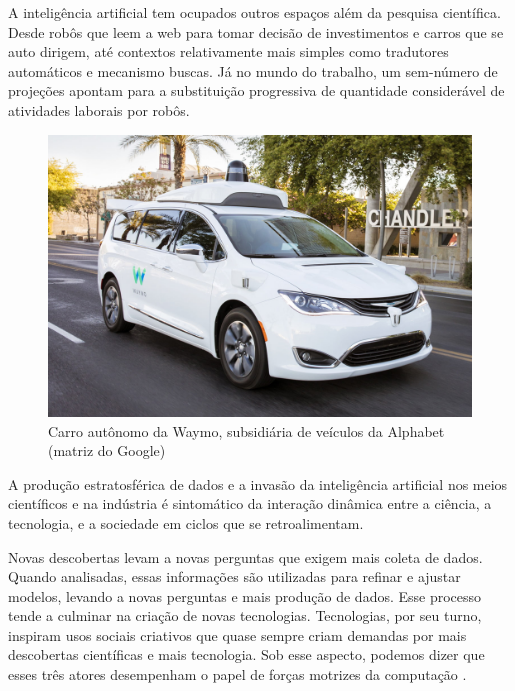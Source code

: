 A inteligência artificial tem ocupados outros espaços além da pesquisa científica. Desde robôs que leem a web para tomar decisão de investimentos \cite[]{Bloomberg} e carros que se auto dirigem, até contextos relativamente mais simples como tradutores automáticos e mecanismo buscas. Já no mundo do trabalho, um sem-número de projeções apontam para a substituição progressiva de quantidade considerável de atividades laborais por robôs.


\begin{figure}[!htb]
	\begin{center}
	    \includegraphics[scale=0.25]{imagens/waymo}
	\end{center}
	\caption{\label{Waymo} Carro autônomo da Waymo, subsidiária de veículos da Alphabet (matriz do Google)}
\end{figure}

A produção estratosférica de dados e a invasão da inteligência artificial nos meios científicos e na indústria é sintomático da interação dinâmica entre a ciência, a tecnologia, e a sociedade em ciclos que se retroalimentam.

Novas descobertas levam a novas perguntas que exigem mais coleta de dados. Quando analisadas, essas informações são utilizadas para refinar e ajustar modelos, levando a novas perguntas e mais produção de dados. Esse processo tende a culminar na criação de novas tecnologias. Tecnologias, por seu turno, inspiram usos sociais criativos que quase sempre criam demandas por mais descobertas científicas e mais tecnologia. Sob esse aspecto, podemos dizer que esses três atores desempenham o papel de forças motrizes da computação \cite[]{wing2008}. 

